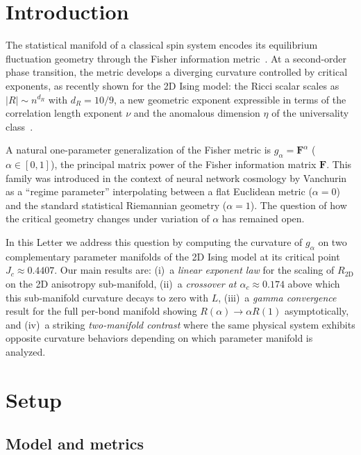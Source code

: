 \documentclass[twocolumn,showpacs,preprintnumbers,amsmath,amssymb,prl]{revtex4-2}
\newcommand{\Fmat}{\mathbf{F}}
\newcommand{\dR}{d_R}
\newcommand{\RtwoD}{R_{\mathrm{2D}}}
\newcommand{\alphac}{\alpha_c}
\begin{document}
\section{Introduction}
\label{sec:intro}

The statistical manifold of a classical spin system encodes its equilibrium
fluctuation geometry through the Fisher information
metric~\cite{Amari2000,Rao1945}.
At a second-order phase transition, the metric develops a diverging curvature
controlled by critical exponents, as recently shown for the 2D Ising model:
the Ricci scalar scales as $|R| \sim n^{\dR}$ with $\dR = 10/9$, a new
geometric exponent expressible in terms of the correlation length exponent $\nu$
and the anomalous dimension $\eta$ of the universality
class~\cite{ZhuravlevPaper8}.

A natural one-parameter generalization of the Fisher metric is
$g_\alpha = \Fmat^\alpha$ ($\alpha \in [0,1]$), the principal matrix power of
the Fisher information matrix $\Fmat$.
This family was introduced in the context of neural network cosmology by
Vanchurin~\cite{Vanchurin2021} as a ``regime parameter'' interpolating between a
flat Euclidean metric ($\alpha=0$) and the standard statistical Riemannian
geometry ($\alpha=1$).
The question of how the critical geometry changes under variation of $\alpha$
has remained open.

In this Letter we address this question by computing the curvature of
$g_\alpha$ on two complementary parameter manifolds of the 2D Ising model
at its critical point $J_c \approx 0.4407$.
Our main results are:
(i)~a \emph{linear exponent law} for the scaling of $\RtwoD$ on the 2D
anisotropy sub-manifold,
(ii)~a \emph{crossover at $\alphac \approx 0.174$} above which this sub-manifold
curvature decays to zero with $L$,
(iii)~a \emph{gamma convergence} result for the full per-bond manifold showing
$R(\alpha) \to \alpha R(1)$ asymptotically, and
(iv)~a striking \emph{two-manifold contrast} where the same physical system
exhibits opposite curvature behaviors depending on which parameter manifold is
analyzed.

\section{Setup}
\label{sec:setup}

\subsection{Model and metrics}
\end{document}
